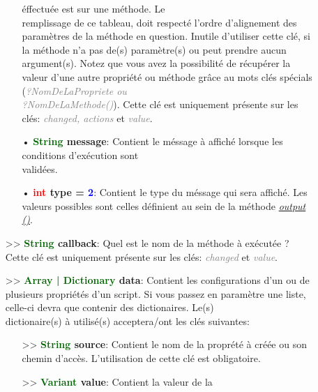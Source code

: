 \documentclass[a4paper, 11pt]{article}
\begin{document}
\begin{description}
\begin{itemize}
\begin{itemize}
		    	éffectuée est sur une méthode. Le \\remplissage de ce tableau, doit respecté l'ordre 
		    	d'alignement des paramètres de la méthode en question. Inutile d'utiliser cette clé, si la 
		    	méthode n'a pas de(s) paramètre(s) ou peut prendre aucun argument(s). Notez que vous avez la 
		    	possibilité de récupérer la valeur d'une autre propriété ou méthode grâce au mots clés 
		    	spécials (\textit{\textcolor {gray}{?NomDeLaPropriete ou \\?NomDeLaMethode()}}). Cette clé 
		    	est uniquement présente sur les clés: \textit{\textcolor {gray}{changed, actions}} et 
		    	\textit{\textcolor {gray}{value}}.\\
		    	\item[• \textbf{\textcolor{darkgreen}{String} message}:] Contient le méssage à affiché 
		    	lorsque les conditions d'exécution sont \\validées.\\
		    	\item[• \textbf{\textcolor{red}{int} type = \textcolor{blue}{2}}:] Contient le type du 
		    	méssage qui sera affiché. Les valeurs possibles sont celles définient au sein de la méthode 
		    	\textit{\textcolor {blue}{\hyperlink{output}{output ()}}}.\\
		    \end{itemize}
		    \item[>> \textbf{\textcolor{darkgreen}{String} callback}:] Quel est le nom de la méthode à 
		    exécutée ? Cette clé est uniquement présente sur les clés: \textit{\textcolor {gray}{changed}} 
		    et \textit{\textcolor {gray}{value}}.\\
		\end{itemize}
		\begin{itemize}
			\item[>> \textbf{\textcolor{darkgreen}{Array | Dictionary} data}:] Contient les configurations
			d'un ou de plusieurs propriétés d'un script. Si vous passez en paramètre une liste, celle-ci 
			devra que contenir des dictionaires. Le(s) \\dictionaire(s) à utilisé(s) acceptera/ont les clés 
			suivantes:
			\begin{itemize}
				\item[>> \textbf{\textcolor{darkgreen}{String} source}:] Contient le nom de la proprété à 
				créée ou son chemin d'accès. L'utilisation de cette clé est obligatoire.\\
				\item[>> \textbf{\textcolor{darkgreen}{Variant} value}:] Contient la valeur de la 

\end{itemize}
\end{itemize}
\end{description}
\end{document}
